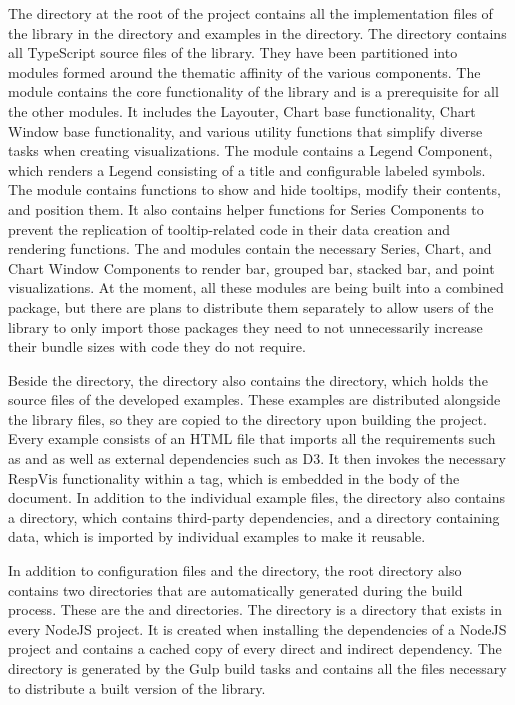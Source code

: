 The  directory at the root of the project contains all the implementation files of the library in the  directory and examples in the  directory.
The  directory contains all TypeScript source files of the library.
They have been partitioned into modules formed around the thematic affinity of the various components.
The  module contains the core functionality of the library and is a prerequisite for all the other modules.
It includes the Layouter, Chart base functionality, Chart Window base functionality, and various utility functions that simplify diverse tasks when creating visualizations.
The  module contains a Legend Component, which renders a Legend consisting of a title and configurable labeled symbols.
The  module contains functions to show and hide tooltips, modify their contents, and position them.
It also contains helper functions for Series Components to prevent the replication of tooltip-related code in their data creation and rendering functions.
The  and  modules contain the necessary Series, Chart, and Chart Window Components to render bar, grouped bar, stacked bar, and point visualizations. 
At the moment, all these modules are being built into a combined package, but there are plans to distribute them separately to allow users of the library to only import those packages they need to not unnecessarily increase their bundle sizes with code they do not require.

Beside the  directory, the  directory also contains the  directory, which holds the source files of the developed examples.
These examples are distributed alongside the library files, so they are copied to the  directory upon building the project.
Every example consists of an HTML file that imports all the requirements such as  and  as well as external dependencies such as D3.
It then invokes the necessary RespVis functionality within a  tag, which is embedded in the body of the document.
In addition to the individual example files, the  directory also contains a  directory, which contains third-party dependencies, and a  directory containing data, which is imported by individual examples to make it reusable.

In addition to configuration files and the  directory, the root directory also contains two directories that are automatically generated during the build process.
These are the  and  directories.
The  directory is a directory that exists in every NodeJS project.
It is created when installing the dependencies of a NodeJS project and contains a cached copy of every direct and indirect dependency.
The  directory is generated by the Gulp build tasks and contains all the files necessary to distribute a built version of the library.

